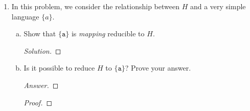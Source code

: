 \documentclass[10pt]{article}
\begin{document}
\begin{enumerate}[1)]
\begin{enumerate}[a)]
\item
Use the graph algorithm we describe to find a coloring of $G$.
\begin{proof}[Solution]
Start with $B$ and color each edge alternately.
\begin{align*}
Red &= \{(B, 1), (B, 4)\}\\
Blue &= \{(B, 3)\}
\end{align*}
Now do vertex $3$:
\begin{align*}
Red &= \{(B, 1), (B, 4), (A, 3)\}\\
Blue &= \{(B, 3)\}
\end{align*}
Now vertex $A$:
\begin{align*}
Red &= \{(B, 1), (B, 4), (A, 3)\}\\
Blue &= \{(B, 3), (A, 4)\}
\end{align*}
Now vertex $4$: (it has one of each already, so pick arbitrarily.)
\begin{align*}
Red &= \{(B, 1), (B, 4), (A, 3)\}\\
Blue &= \{(B, 3), (A, 4), (C, 4)\}
\end{align*}
And now the last edge:
\begin{align*}
Red &= \{(B, 1), (B, 4), (A, 3), (D, 2)\}\\
Blue &= \{(B, 3), (A, 4), (C, 4)\}
\end{align*}
\end{proof}
\end{enumerate}



\item
In this problem, we consider the relationship between $H$ and a very simple language $\{a\}$.
\begin{enumerate}[a)]

\item
Show that $\{\texttt{a}\}$ is \emph{mapping} reducible to $H$.  
\begin{proof}[Solution]
\end{proof}

\item
Is it possible to reduce $H$ to $\{\texttt{a}\}$?  Prove your answer.
\begin{proof}[Answer]
\end{proof}
\begin{proof}[Proof]
\end{proof}
\end{enumerate}



\end{enumerate}
\end{document}
